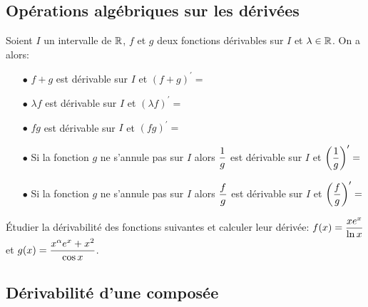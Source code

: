 \documentclass[a4paper, 11pt]{article}
\begin{document}
\subsection{Op\'erations alg\'ebriques sur les d\'eriv\'ees}

{\noindent

	\begin{prop}
		Soient $I$ un intervalle de $\mathbb{R}$, $f$ et $g$ deux fonctions d\'erivables sur $I$ et $\lambda\in\mathbb{R}$. On a alors:\vsec
		\begin{itemize}
			\item[$\bullet$] $f+g$ est d\'erivable sur $I$ et $(f+g)^{\prime}=$\dotfill \phantom{\hspace{5cm}}\vsec
			\item[$\bullet$] $\lambda f$ est d\'erivable sur $I$ et $(\lambda f)^{\prime}=$\dotfill \phantom{\hspace{5cm}} \vsec
			\item[$\bullet$] $fg$ est d\'erivable sur $I$ et $(fg)^{\prime}=$\dotfill \phantom{\hspace{5cm}} \vsec
			\item[$\bullet$] Si la fonction $g$ ne s'annule pas sur $I$ alors $\displaystyle\frac{1}{g}$ est d\'erivable sur $I$ et $\left(\displaystyle\frac{1}{g}\right)^{\prime}=$\dotfill \vsec
			\item[$\bullet$] Si la fonction $g$ ne s'annule pas sur $I$ alors $\displaystyle\frac{f}{g}$ est d\'erivable sur $I$ et $\left(\displaystyle\frac{f}{g}\right)^{\prime}=$\dotfill \vsec
		\end{itemize}
	\end{prop}
}

{\footnotesize \begin{exercice}
		\'Etudier la d\'erivabilit\'e des fonctions suivantes et calculer leur d\'eriv\'ee: $ f(x)=\displaystyle\frac{xe^x}{\ln{x}}$ et $g(x)=\displaystyle\frac{x^{\alpha}e^x+x^2}{\cos{x}}$.
	\end{exercice}}


\subsection{D\'erivabilit\'e d'une compos\'ee}
\end{document}
